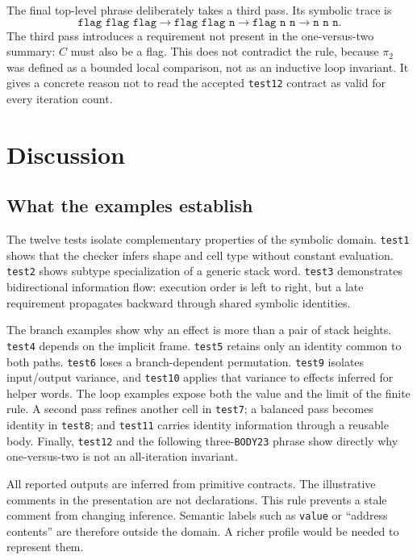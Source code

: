 \documentclass[11pt,a4paper]{article}
\begin{document}
The final top-level phrase deliberately takes a third pass.  Its symbolic trace
is
\[
 \texttt{flag flag flag}
 \longrightarrow \texttt{flag flag n}
 \longrightarrow \texttt{flag n n}
 \longrightarrow \texttt{n n n}.
\]
The third pass introduces a requirement not present in the one-versus-two
summary: $C$ must also be a flag.  This does not contradict the rule, because
$\pi_2$ was defined as a bounded local comparison, not as an inductive
loop invariant.  It gives a concrete reason not to read the accepted
\texttt{test12} contract as valid for every iteration count.

\section{Discussion}

\subsection{What the examples establish}

The twelve tests isolate complementary properties of the symbolic domain.
\texttt{test1} shows that the checker infers shape and cell type without
constant evaluation.  \texttt{test2} shows subtype specialization of a generic
stack word.  \texttt{test3} demonstrates bidirectional information flow:
execution order is left to right, but a late requirement propagates backward
through shared symbolic identities.

The branch examples show why an effect is more than a pair of stack heights.
\texttt{test4} depends on the implicit frame.  \texttt{test5} retains only an
identity common to both paths.  \texttt{test6} loses a branch-dependent
permutation.  \texttt{test9} isolates input/output variance, and
\texttt{test10} applies that variance to effects inferred for helper words.
The loop examples expose both the value and the limit of the finite rule.  A
second pass refines another cell in \texttt{test7}; a balanced pass becomes
identity in \texttt{test8}; and \texttt{test11} carries identity information
through a reusable body.  Finally, \texttt{test12} and the following
three-\texttt{BODY23} phrase show directly why one-versus-two is not an
all-iteration invariant.

All reported outputs are inferred from primitive contracts.  The illustrative
comments in the presentation are not declarations.  This rule prevents a stale
comment from changing inference.  Semantic labels such as \texttt{value} or
``address contents'' are therefore outside the domain.  A richer profile would
be needed to represent them.
\end{document}
